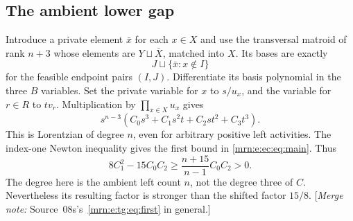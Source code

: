 \documentclass[11pt,a4paper]{article}
\theoremstyle{remark}\newtheorem{remark}[theorem]{Remark}
\newcommand{\mnote}[1]{[\textit{Merge note:} #1]}
\begin{document}
\subsection{The ambient lower gap}
Introduce a private element $\bar x$ for each $x\in X$ and use the transversal matroid of rank $n+3$ whose elements are $Y\sqcup\bar X$, matched into $X$. Its bases are exactly
\[
 J\sqcup\{\bar x:x\notin I\}
\]
for the feasible endpoint pairs $(I,J)$. Differentiate its basis polynomial in the three $B$ variables. Set the private variable for $x$ to $s/u_x$, and the variable for $r\in R$ to $tv_r$. Multiplication by $\prod_{x\in X}u_x$ gives
\begin{equation}\label{mrn:e:ec:eq:ambient}
 s^{n-3}(C_0s^3+C_1s^2t+C_2st^2+C_3t^3).
\end{equation}
This is Lorentzian of degree $n$, even for arbitrary positive left activities. The index-one Newton inequality gives the first bound in \eqref{mrn:e:ec:eq:main}. Thus
\begin{equation}\label{mrn:e:ec:eq:lowerstrict}
 8C_1^2-15C_0C_2\ge\frac{n+15}{n-1}C_0C_2>0.
\end{equation}
The degree here is the ambient left count $n$, not the degree three of $C$. Nevertheless its resulting factor is stronger than the shifted factor $15/8$. \mnote{Source~08s's~\eqref{mrn:e:tg:eq:first} in general.}
\end{document}
